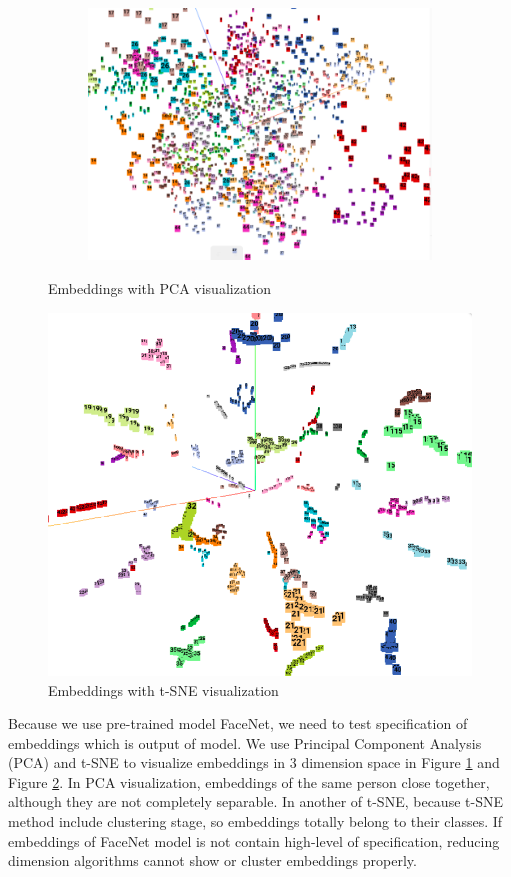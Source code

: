\documentclass[journal, twocolumn]{IEEEtran}
\begin{document}
\begin{figure}[h!]
\begin{subfigure}[b]{0.5\linewidth}
    \includegraphics[width=\linewidth]{img/pca3.png}
    \caption{}
  \end{subfigure}
  \caption{Embeddings with PCA visualization} 
  \label{fig:pca}
\end{figure}

\begin{figure}
    \centering
    \includegraphics[width=0.7\linewidth]{img/t-sne.png}
	\caption{Embeddings with t-SNE visualization}\label{fig:t-sne}
\end{figure}
Because we use pre-trained model FaceNet, we need to test specification of embeddings which is output of model. We use Principal Component Analysis (PCA) and t-SNE \cite{ref:t-sne} to visualize embeddings in 3 dimension space in Figure \ref{fig:pca} and Figure \ref{fig:t-sne}. In PCA visualization, embeddings of the same person close together, although they are not completely separable. In another of t-SNE, because t-SNE method include clustering stage, so embeddings totally belong to their classes. If embeddings of FaceNet model is not contain high-level of specification, reducing dimension algorithms cannot show or cluster embeddings properly.  
\end{document}
